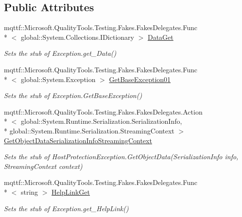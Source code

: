 \subsection*{Public Attributes}
\begin{DoxyCompactItemize}
\item 
mqttf\-::\-Microsoft.\-Quality\-Tools.\-Testing.\-Fakes.\-Fakes\-Delegates.\-Func\\*
$<$ global\-::\-System.\-Collections.\-I\-Dictionary $>$ \hyperlink{class_system_1_1_security_1_1_fakes_1_1_stub_host_protection_exception_a9aac9635022c39ce445186d95a0af105}{Data\-Get}
\begin{DoxyCompactList}\small\item\em Sets the stub of Exception.\-get\-\_\-\-Data()\end{DoxyCompactList}\item 
mqttf\-::\-Microsoft.\-Quality\-Tools.\-Testing.\-Fakes.\-Fakes\-Delegates.\-Func\\*
$<$ global\-::\-System.\-Exception $>$ \hyperlink{class_system_1_1_security_1_1_fakes_1_1_stub_host_protection_exception_a061ff5cff97809754f4c28b8169ffda1}{Get\-Base\-Exception01}
\begin{DoxyCompactList}\small\item\em Sets the stub of Exception.\-Get\-Base\-Exception()\end{DoxyCompactList}\item 
mqttf\-::\-Microsoft.\-Quality\-Tools.\-Testing.\-Fakes.\-Fakes\-Delegates.\-Action\\*
$<$ global\-::\-System.\-Runtime.\-Serialization.\-Serialization\-Info, \\*
global\-::\-System.\-Runtime.\-Serialization.\-Streaming\-Context $>$ \hyperlink{class_system_1_1_security_1_1_fakes_1_1_stub_host_protection_exception_a092d0f3a646eeaf6549ced2c8004647e}{Get\-Object\-Data\-Serialization\-Info\-Streaming\-Context}
\begin{DoxyCompactList}\small\item\em Sets the stub of Host\-Protection\-Exception.\-Get\-Object\-Data(\-Serialization\-Info info, Streaming\-Context context)\end{DoxyCompactList}\item 
mqttf\-::\-Microsoft.\-Quality\-Tools.\-Testing.\-Fakes.\-Fakes\-Delegates.\-Func\\*
$<$ string $>$ \hyperlink{class_system_1_1_security_1_1_fakes_1_1_stub_host_protection_exception_a4f9bfb0b06a817b388b6236b9af39ea2}{Help\-Link\-Get}
\begin{DoxyCompactList}\small\item\em Sets the stub of Exception.\-get\-\_\-\-Help\-Link()\end{DoxyCompactList}\item 

\end{DoxyCompactItemize}

